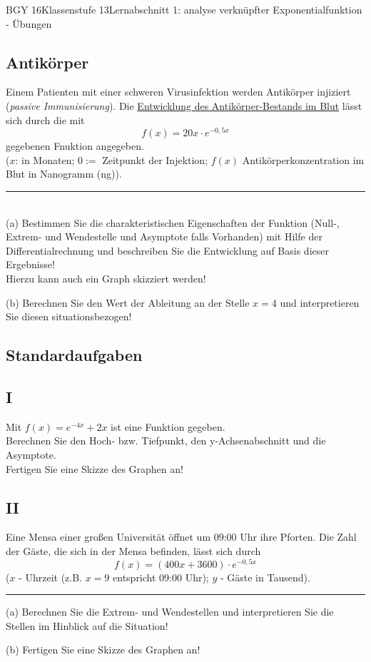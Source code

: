 \documentclass[oneside,openany,headings=optiontotoc,11pt,numbers=noenddot]{scrreprt}
\begin{document}
\begin{worksheet}{BGY 16}{Klassenstufe 13}{Lernabschnitt 1: analyse verknüpfter Exponentialfunktion - Übungen}
\begin{framed}
			\section*{Antikörper}
			Einem Patienten mit einer schweren Virusinfektion werden Antikörper injiziert (\textit{passive Immunisierung}). Die \underline{Entwicklung des Antikörper-Bestands im Blut} lässt sich durch die mit \[f(x) = 20x\cdot{}e^{-0,5x}\] gegebenen Fnuktion angegeben.\\
			(\(x\): in Monaten; \(0:=\) Zeitpunkt der Injektion; \(f(x)\) Antikörperkonzentration im Blut in Nanogramm (ng)).\\
			\par\noindent
			\rule{\textwidth}{0.1pt}\\
			(a) Bestimmen Sie die charakteristischen Eigenschaften der Funktion (Null-, Extrem- und Wendestelle und Asymptote falls Vorhanden) mit Hilfe der Differentialrechnung und beschreiben Sie die Entwicklung auf Basis dieser Ergebnisse!\\
			Hierzu kann auch ein Graph skizziert werden!\\
			\par\noindent
			(b) Berechnen Sie den Wert der Ableitung an der Stelle \(x=4\) und interpretieren Sie diesen situationsbezogen!
		\end{framed}
		\begin{framed}
			\section*{Standardaufgaben}
			\subsection{I}
			Mit \(f(x) = e^{-4x} + 2x\) ist eine Funktion gegeben.\\
			Berechnen Sie den Hoch- bzw. Tiefpunkt, den y-Achsenabschnitt und die Asymptote.\\
			Fertigen Sie eine Skizze des Graphen an!
			\subsection{II}
			Eine Mensa einer großen Universität öffnet um 09:00 Uhr ihre Pforten. Die Zahl der Gäste, die sich in der Mensa befinden, lässt sich durch \[f(x) = (400x + 3600)\cdot{}e^{-0,5x}\] (\(x\) - Uhrzeit (z.B. \(x = 9\) entspricht 09:00 Uhr); \(y\) - Gäste in Tausend).\\
			\par\noindent
			\rule{\textwidth}{0.1pt}
			(a) Berechnen Sie die Extrem- und Wendestellen und interpretieren Sie die Stellen im Hinblick auf die Situation!\\
			\par\noindent
			(b) Fertigen Sie eine Skizze des Graphen an!
		\end{framed}
	\end{worksheet}
\end{document}
